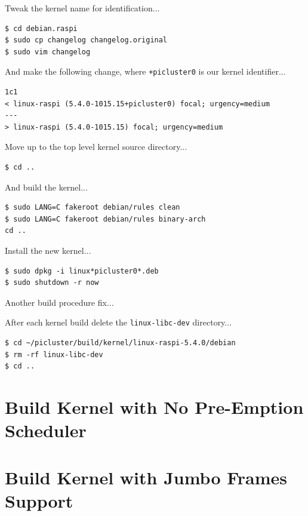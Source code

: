 \documentclass{report}
\begin{document}
Tweak the kernel name for identification...

\lstset{style=type}
\begin{lstlisting}
$ cd debian.raspi
$ sudo cp changelog changelog.original
$ sudo vim changelog
\end{lstlisting}

And make the following change, where \verb|+picluster0| is our kernel identifier...

\lstset{style=listing}
\begin{lstlisting}[caption=diff changelog changelog.original, numbers=none]
1c1
< linux-raspi (5.4.0-1015.15+picluster0) focal; urgency=medium
---
> linux-raspi (5.4.0-1015.15) focal; urgency=medium
\end{lstlisting}

Move up to the top level kernel source directory...

\lstset{style=type}
\begin{lstlisting}
$ cd ..
\end{lstlisting}

And build the kernel...

\lstset{style=type}
\begin{lstlisting}
$ sudo LANG=C fakeroot debian/rules clean
$ sudo LANG=C fakeroot debian/rules binary-arch
cd ..
\end{lstlisting}

Install the new kernel...

\lstset{style=type}
\begin{lstlisting}
$ sudo dpkg -i linux*picluster0*.deb
$ sudo shutdown -r now
\end{lstlisting}

Another build procedure fix...

After each kernel build delete the \verb|linux-libc-dev| directory...

\lstset{style=type}
\begin{lstlisting}
$ cd ~/picluster/build/kernel/linux-raspi-5.4.0/debian
$ rm -rf linux-libc-dev
$ cd ..
\end{lstlisting}


%
%
\chapter{Build Kernel with No Pre-Emption Scheduler}


%
%
\chapter{Build Kernel with Jumbo Frames Support}
\end{document}
